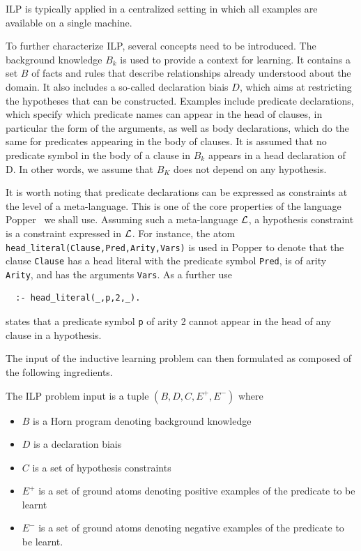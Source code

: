 \noindent
ILP is typically applied in a centralized setting 
in which all examples are available on a single machine.

To further characterize ILP, several concepts need to be introduced. 
The background knowledge $B_k$ is used to provide a context for
learning. It contains a set $B$ of facts and rules that describe
relationships already understood about the domain. It also includes a
so-called declaration biais $D$, which aims at restricting the
hypotheses that can be constructed. Examples include predicate
declarations, which specify which predicate names can appear in the
head of clauses, in particular the form of the arguments, as well as body
declarations, which do the same for predicates appearing in the body
of clauses. It is assumed that no predicate symbol in the body of a
clause in $B_k$ appears in a head declaration of D. In other words, we
assume that $B_K$ does not depend on any hypothesis.

\begin{sloppypar}
It is worth noting that predicate declarations can be expressed as constraints at the
level of a meta-language. This is one of the core properties of the
language Popper~\cite{popper} we shall use. Assuming such a meta-language ${\cal L}$, 
a hypothesis constraint is a constraint expressed in ${\cal L}$. For instance, 
the atom \texttt{head\_literal(Clause,Pred,Arity,Vars)} is used in Popper to denote that the clause
\texttt{Clause} has a head literal with the predicate symbol \texttt{Pred}, is of arity \texttt{Arity}, and has the
arguments \texttt{Vars}. As a further use
\end{sloppypar}

\begin{lstlisting}
  :- head_literal(_,p,2,_).
\end{lstlisting}

\noindent
states that a predicate symbol \texttt{p} of arity 2 cannot appear in the head of
any clause in a hypothesis.

The input of the inductive learning problem can then formulated as composed of the following ingredients.

\begin{definition}
\label{ilp-problem}
The ILP problem input is a tuple $(B, D, C, E^+, E^-)$ where

\begin{itemize}

\item $B$ is a Horn program denoting background knowledge
\item $D$ is a declaration biais
\item $C$ is a set of hypothesis constraints
\item $E^+$ is a set of ground atoms denoting positive examples of the predicate to be learnt
\item $E^-$ is a set of ground atoms denoting negative examples of the predicate to be learnt.

\end{itemize}
\end{definition}


